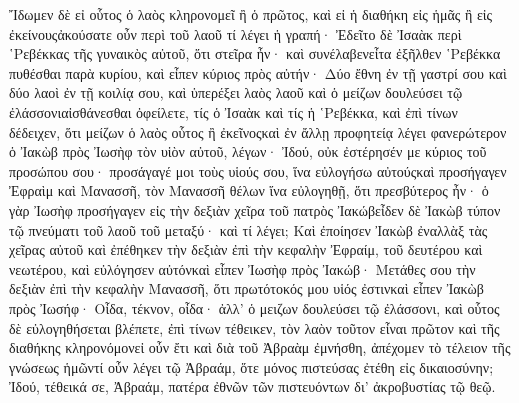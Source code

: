 Ἴδωμεν δὲ εἰ οὗτος ὁ λαὸς κληρονομεῖ ἢ ὁ πρῶτος, καὶ εἰ ἡ διαθήκη εἰς ἡμᾶς ἢ εἰς ἐκείνουςἀκούσατε οὖν περὶ τοῦ λαοῦ τί λέγει ἡ γραπή· Ἐδεῖτο δὲ Ἰσαὰκ περὶ ῾Ρεβέκκας τῆς γυναικὸς αὐτοῦ, ὅτι στεῖρα ἦν· καὶ συνέλαβενεἶτα ἐξῆλθεν ῾Ρεβέκκα πυθέσθαι παρὰ κυρίου, καὶ εἶπεν κύριος πρὸς αὐτήν· Δύο ἔθνη ἐν τῇ γαστρί σου καὶ δύο λαοὶ ἐν τῇ κοιλίᾳ σου, καὶ ὑπερέξει λαὸς λαοῦ καὶ ὁ μείζων δουλεύσει τῷ ἐλάσσονιαἰσθάνεσθαι ὀφείλετε, τίς ὁ Ἰσαὰκ καὶ τίς ἡ ῾Ρεβέκκα, καὶ ἐπὶ τίνων δέδειχεν, ὅτι μείζων ὁ λαὸς οὗτος ἢ ἐκεῖνοςκαὶ ἐν ἄλλῃ προφητείᾳ λέγει φανερώτερον ὁ Ἰακὼβ πρὸς Ἰωσὴφ τὸν υἱὸν αὐτοῦ, λέγων· Ἰδού, οὐκ ἐστέρησέν με κύριος τοῦ προσώπου σου· προσάγαγέ μοι τοὺς υἱούς σου, ἵνα εὐλογήσω αὐτούςκαὶ προσήγαγεν Ἐφραὶμ καὶ Μανασσῆ, τὸν Μανασσῆ θέλων ἵνα εὐλογηθῇ, ὅτι πρεσβύτερος ἦν· ὁ γὰρ Ἰωσὴφ προσήγαγεν εἰς τὴν δεξιὰν χεῖρα τοῦ πατρὸς Ἰακώβεἶδεν δὲ Ἰακὼβ τύπον τῷ πνεύματι τοῦ λαοῦ τοῦ μεταξύ· καὶ τί λέγει; Καὶ ἐποίησεν Ἰακὼβ ἐναλλὰξ τὰς χεῖρας αὐτοῦ καὶ ἐπέθηκεν τὴν δεξιὰν ἐπὶ τὴν κεφαλὴν Ἐφραίμ, τοῦ δευτέρου καὶ νεωτέρου, καὶ εὐλόγησεν αὐτόνκαὶ εἶπεν Ἰωσὴφ πρὸς Ἰακώβ· Μετάθες σου τὴν δεξιὰν ἐπὶ τὴν κεφαλὴν Μανασσῆ, ὅτι πρωτότοκός μου υἱός ἐστινκαὶ εἶπεν Ἰακὼβ πρὸς Ἰωσήφ· Οἶδα, τέκνον, οἶδα· ἀλλ’ ὁ μειζων δουλεύσει τῷ ἐλάσσονι, καὶ οὗτος δὲ εὐλογηθήσεται βλέπετε, ἐπὶ τίνων τέθεικεν, τὸν λαὸν τοῦτον εἶναι πρῶτον καὶ τῆς διαθήκης κληρονόμονεἰ οὖν ἔτι καὶ διὰ τοῦ Ἀβραὰμ ἐμνήσθη, ἀπέχομεν τὸ τέλειον τῆς γνώσεως ἡμῶντί οὖν λέγει τῷ Ἀβραάμ, ὅτε μόνος πιστεύσας ἐτέθη εἰς δικαιοσύνην; Ἰδού, τέθεικά σε, Ἀβραάμ, πατέρα ἐθνῶν τῶν πιστευόντων δι’ ἀκροβυστίας τῷ θεῷ.
